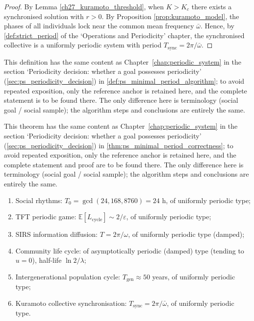 \begin{proof}
By Lemma \ref{ch27_kuramoto_threshold}, when $K>K_c$ there exists a synchronised solution with $r>0$. By Proposition \ref{prop:kuramoto_model}, the phases of all individuals lock near the common mean frequency $\bar\omega$. Hence, by \cref{def:strict_period} of the `Operations and Periodicity' chapter, the synchronised collective is a uniformly periodic system with period $T_{\text{sync}}=2\pi/\bar\omega$.
\end{proof}

\begin{definition}\label{def:social_minimal_period_algorithm}
This definition has the same content as Chapter~\ref{chap:periodic_system} in the section `Periodicity decision: whether a goal possesses periodicity' (\cref{sec:ps_periodicity_decision}) in \cref{def:ps_minimal_period_algorithm}; to avoid repeated exposition, only the reference anchor is retained here, and the complete statement is to be found there. The only difference here is terminology (social goal / social sample); the algorithm steps and conclusions are entirely the same.
\end{definition}

\begin{theorem}\label{thm:social_minimal_period_correctness}
This theorem has the same content as Chapter~\ref{chap:periodic_system} in the section `Periodicity decision: whether a goal possesses periodicity' (\cref{sec:ps_periodicity_decision}) in \cref{thm:ps_minimal_period_correctness}; to avoid repeated exposition, only the reference anchor is retained here, and the complete statement and proof are to be found there. The only difference here is terminology (social goal / social sample); the algorithm steps and conclusions are entirely the same.
\end{theorem}

\begin{example}\label{ex:social_periodic_examples}
\begin{enumerate}[label=(\roman*)]
    \item Social rhythms: $T_0=\gcd(24,168,8760)=24$ h, of uniformly periodic type;
    \item TFT periodic game: $\mathbb{E}[L_{\text{cycle}}]\sim2/\varepsilon$, of uniformly periodic type;
    \item SIRS information diffusion: $T=2\pi/\omega$, of uniformly periodic type (damped);
    \item Community life cycle: of asymptotically periodic (damped) type (tending to $u=0$), half-life $\ln2/\lambda$;
    \item Intergenerational population cycle: $T_{\text{gen}}\approx50$ years, of uniformly periodic type;
    \item Kuramoto collective synchronisation: $T_{\text{sync}}=2\pi/\bar\omega$, of uniformly periodic type.
\end{enumerate}
\end{example}

